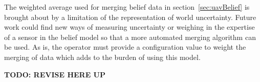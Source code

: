 The weighted average used for merging belief data in section~\ref{sec:uavBelief} is brought about by a limitation of the representation of world uncertainty.  Future work could find new ways of measuring uncertainty or weighing in the expertise of a sensor in the belief model so that a more automated merging algorithm can be used.  As is, the operator must provide a configuration value to weight the merging of data which adds to the burden of using this model.

\textbf{TODO: REVISE HERE UP}
 





